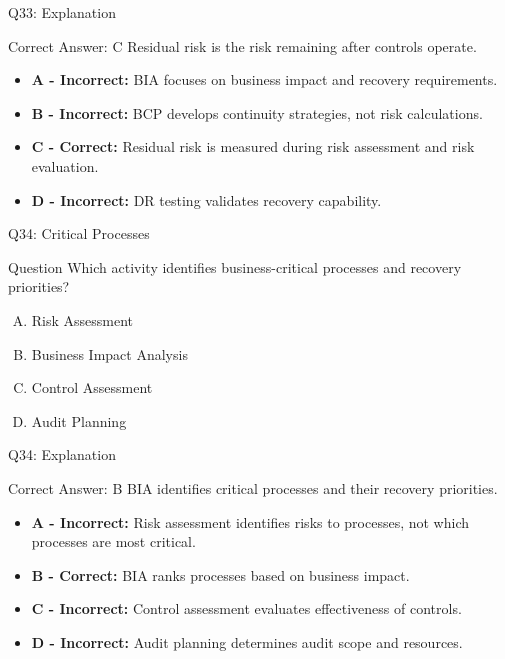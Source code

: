 \documentclass{beamer}
\begin{document}
	\begin{frame}{Q33: Explanation}
		\begin{block}{Correct Answer: C}
			Residual risk is the risk remaining after controls operate.
		\end{block}
		
		\begin{itemize}
			\item \textbf{A - Incorrect:} BIA focuses on business impact and recovery requirements.
			\item \textbf{B - Incorrect:} BCP develops continuity strategies, not risk calculations.
			\item \textbf{C - Correct:} Residual risk is measured during risk assessment and risk evaluation.
			\item \textbf{D - Incorrect:} DR testing validates recovery capability.
		\end{itemize}
	\end{frame}
	
	\begin{frame}{Q34: Critical Processes}
		\begin{block}{Question}
			Which activity identifies business-critical processes and recovery priorities?
		\end{block}
		
		\begin{enumerate}[(A)]
			\item Risk Assessment
			\item Business Impact Analysis
			\item Control Assessment
			\item Audit Planning
		\end{enumerate}
	\end{frame}
	
	\begin{frame}{Q34: Explanation}
		\begin{block}{Correct Answer: B}
			BIA identifies critical processes and their recovery priorities.
		\end{block}
		
		\begin{itemize}
			\item \textbf{A - Incorrect:} Risk assessment identifies risks to processes, not which processes are most critical.
			\item \textbf{B - Correct:} BIA ranks processes based on business impact.
			\item \textbf{C - Incorrect:} Control assessment evaluates effectiveness of controls.
			\item \textbf{D - Incorrect:} Audit planning determines audit scope and resources.
		\end{itemize}
	\end{frame}
	
\end{document}
